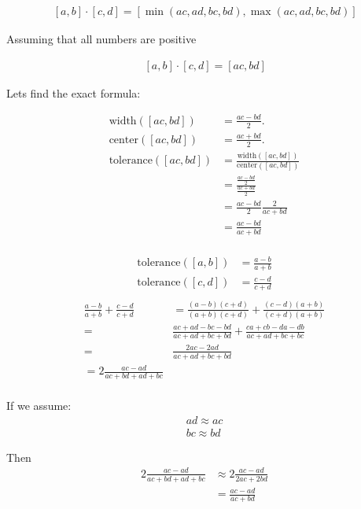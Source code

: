 \documentclass{article}
\begin{document}
\newcommand \w[0]{\text{width}}
\renewcommand \c[0]{\text{center}}
\renewcommand \t[0]{\text{tolerance}}

\[
   \begin{aligned}
      \, [a, b] \cdot [c, d] = \left[
         \min(ac, ad, bc, bd), 
         \max(ac, ad, bc, bd)
      \right]
   \end{aligned}
\]

Assuming that all numbers are positive

\[
   \begin{aligned}
      \, [a, b] \cdot [c, d] = \left[ ac, bd \right]
   \end{aligned}
\]

Lets find the exact formula:

\[
   \begin{aligned}
      \w([ac, bd]) &= \frac{ac - bd}{2}. \\
      \c([ac, bd]) &= \frac{ac + bd}{2}. \\
      \t([ac, bd]) &= \frac{\w([ac, bd])}{\c([ac,bd])} \\
         &= \frac{
            \frac{ac - bd}{2}
         }{
            \frac{ac + bd}{2}
         } \\
         & = \frac{ac - bd}{2}
             \frac{2}{ac + bd} \\
         & = \frac{ac - bd}{ac + bd} \\
   \end{aligned}
\]

\[
   \begin{aligned}
      \t([a, b]) &= \frac{a - b}{a + b} \\
      \t([c, d]) &= \frac{c - d}{c + d} \\
   \end{aligned}
\]
\[
   \begin{aligned}
      \frac{a - b}{a + b} + \frac{c - d}{c + d} & = 
      \frac{(a - b)(c + d)}{(a + b)(c + d)} + \frac{(c - d)(a + b)}{(c + d)(a +
b)} \\
      = &
      \frac{ac + ad - bc - bd}{ac + ad + bc + bd} + 
      \frac{ca + cb - da - db}{ac + ad + bc + bc} \\
      = &
      \frac{2ac - 2ad}{ac + ad + bc + bd}  \\
      = 2 \frac{ac - ad}{ac + bd + ad + bc}  \\
   \end{aligned}
\]

If we assume:
\[
   \begin{aligned}
   ad \approx ac \\
   bc \approx bd
   \end{aligned}
\]

Then
\[
   \begin{aligned}
   2 \frac{ac - ad}{ac + bd + ad + bc} & \approx 2 \frac{ac - ad}{2 ac + 2 bd} \\
    & = \frac{ac - ad}{ac + bd} \\
   \end{aligned}
\]
\end{document}
